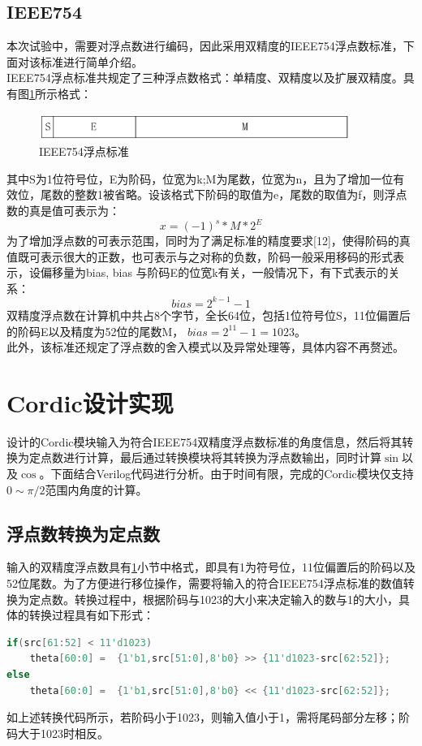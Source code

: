 \documentclass[a4paper,12pt]{report}
\begin{document}
\section{IEEE754}\label{sec1.3}
本次试验中，需要对浮点数进行编码，因此采用双精度的IEEE754浮点数标准，下面对该标准进行简单介绍。\\
\indent IEEE754浮点标准共规定了三种浮点数格式：单精度、双精度以及扩展双精度。具有图\ref{fig1.1}所示格式：
\begin{figure}[!hbtp]
\centering 
\includegraphics[width=0.9\textwidth]{IEEE754_1}
\caption{IEEE754浮点标准}
\label{fig1.1}
\end{figure}
其中S为1位符号位，E为阶码，位宽为k;M为尾数，位宽为n，且为了增加一位有效位，尾数的整数1被省略。设该格式下阶码的取值为e，尾数的取值为f，则浮点数的真是值可表示为：
\begin{equation}
x = (-1)^s * M * 2^E
\end{equation}
为了增加浮点数的可表示范围，同时为了满足标准的精度要求[12]，使得阶码的真值既可表示很大的正数，也可表示与之对称的负数，阶码一般采用移码的形式表示，设偏移量为bias, bias 与阶码E的位宽k有关，一般情况下，有下式表示的关系：
\begin{equation}
bias = 2^{k-1}-1
\end{equation}
双精度浮点数在计算机中共占8个字节，全长64位，包括1位符号位S，11位偏置后的阶码E以及精度为52位的尾数M， $bias = 2^{11} - 1 = 1023$。\\
\indent 此外，该标准还规定了浮点数的舍入模式以及异常处理等，具体内容不再赘述。

\chapter{Cordic设计实现}
设计的Cordic模块输入为符合IEEE754双精度浮点数标准的角度信息，然后将其转换为定点数进行计算，最后通过转换模块将其转换为浮点数输出，同时计算$\sin$以及$\cos$。下面结合Verilog代码进行分析。由于时间有限，完成的Cordic模块仅支持$0 \sim \pi/2$范围内角度的计算。
\section{浮点数转换为定点数}
输入的双精度浮点数具有\ref{sec1.3}小节中格式，即具有1为符号位，11位偏置后的阶码以及52位尾数。为了方便进行移位操作，需要将输入的符合IEEE754浮点标准的数值转换为定点数。转换过程中，根据阶码与1023的大小来决定输入的数与1的大小，具体的转换过程具有如下形式：
{
\footnotesize
\begin{lstlisting}[language=Verilog]
if(src[61:52] < 11'd1023)
	theta[60:0] =  {1'b1,src[51:0],8'b0} >> {11'd1023-src[62:52]};
else
	theta[60:0] =  {1'b1,src[51:0],8'b0} << {11'd1023-src[62:52]};
\end{lstlisting}
}
\noindent 如上述转换代码所示，若阶码小于1023，则输入值小于1，需将尾码部分左移；阶码大于1023时相反。
\end{document}
